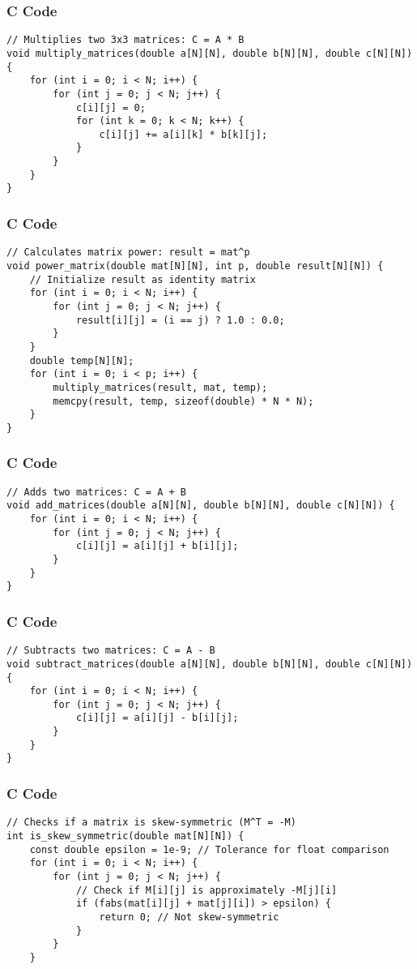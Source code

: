 \documentclass{beamer}
\begin{document}
\begin{frame}[fragile]
\frametitle{C Code}
\begin{lstlisting}
// Multiplies two 3x3 matrices: C = A * B
void multiply_matrices(double a[N][N], double b[N][N], double c[N][N]) {
    for (int i = 0; i < N; i++) {
        for (int j = 0; j < N; j++) {
            c[i][j] = 0;
            for (int k = 0; k < N; k++) {
                c[i][j] += a[i][k] * b[k][j];
            }
        }
    }
}
\end{lstlisting}
\end{frame}

\begin{frame}[fragile]
\frametitle{C Code}
\begin{lstlisting}
// Calculates matrix power: result = mat^p
void power_matrix(double mat[N][N], int p, double result[N][N]) {
    // Initialize result as identity matrix
    for (int i = 0; i < N; i++) {
        for (int j = 0; j < N; j++) {
            result[i][j] = (i == j) ? 1.0 : 0.0;
        }
    }    
    double temp[N][N];
    for (int i = 0; i < p; i++) {
        multiply_matrices(result, mat, temp);
        memcpy(result, temp, sizeof(double) * N * N);
    }
}
\end{lstlisting}
\end{frame}

\begin{frame}[fragile]
\frametitle{C Code}
\begin{lstlisting}
// Adds two matrices: C = A + B
void add_matrices(double a[N][N], double b[N][N], double c[N][N]) {
    for (int i = 0; i < N; i++) {
        for (int j = 0; j < N; j++) {
            c[i][j] = a[i][j] + b[i][j];
        }
    }
}
\end{lstlisting}
\end{frame}

\begin{frame}[fragile]
\frametitle{C Code}
\begin{lstlisting}
// Subtracts two matrices: C = A - B
void subtract_matrices(double a[N][N], double b[N][N], double c[N][N]) {
    for (int i = 0; i < N; i++) {
        for (int j = 0; j < N; j++) {
            c[i][j] = a[i][j] - b[i][j];
        }
    }
}
\end{lstlisting}
\end{frame}

\begin{frame}[fragile]
\frametitle{C Code}
\begin{lstlisting}
// Checks if a matrix is skew-symmetric (M^T = -M)
int is_skew_symmetric(double mat[N][N]) {
    const double epsilon = 1e-9; // Tolerance for float comparison
    for (int i = 0; i < N; i++) {
        for (int j = 0; j < N; j++) {
            // Check if M[i][j] is approximately -M[j][i]
            if (fabs(mat[i][j] + mat[j][i]) > epsilon) {
                return 0; // Not skew-symmetric
            }
        }
    }
\end{lstlisting}
\end{frame}
\end{document}
